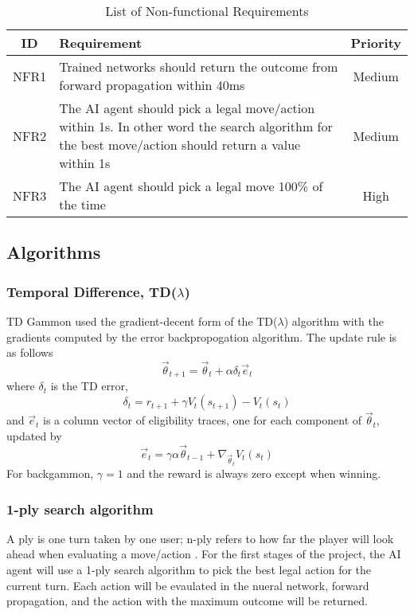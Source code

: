 \documentclass[12pt,a4paper]{article}
\begin{document}
\begin{table}[htb]
    \centering
    \caption{List of Non-functional Requirements}
    \vspace*{6pt}
    \label{nonreq}
    \begin{tabular}{cp{12cm}c}
        \hline
        \hline
        ID & Requirement & Priority \\ 
        \hline
        NFR1 & Trained networks should return the outcome from forward propagation within 40ms & Medium \\
        \hline
        NFR2 & The AI agent should pick a legal move/action within 1s. In other word the search algorithm for the best move/action should return a value within 1s & Medium \\
        \hline
        NFR3 & The AI agent should pick a legal move 100\% of the time & High \\
        \hline
    \end{tabular}
\end{table}
\subsection{Algorithms}
\subsubsection{Temporal Difference, TD($\lambda$)}
TD Gammon used the gradient-decent form of the TD($\lambda$) algorithm with the gradients computed by the error backpropogation algorithm. The update rule is as follows
$$\vec{\theta}_{t+1} = \vec{\theta}_{t} + \alpha\delta_t\vec{e}_{t}$$ 
where $\delta_t$ is the TD error,
$$\delta_{t} = r_{t+1} + \gamma V_t(s_{t+1}) - V_t(s_t)$$ 
and $\vec{e}_t$ is a column vector of eligibility traces, one for each component of $\vec{\theta}_t$, updated by 
$$\vec{e}_{t} = \gamma\alpha\vec{\theta}_{t-1} + \nabla_{\vec{\theta}_{t}}V_t(s_t)$$ 
For backgammon, $\gamma=1$ and the reward is always zero except when winning. 



\subsubsection{1-ply search algorithm}
A ply is one turn taken by one user; n-ply refers to how far the player will look ahead when evaluating a move/action \cite{}. For the first stages of the project, the AI agent will use a 1-ply search algorithm to pick the best legal action for the current turn. Each action will be evaulated in the nueral network, forward propagation, and the action with the maximum outcome will be returned.
\end{document}
